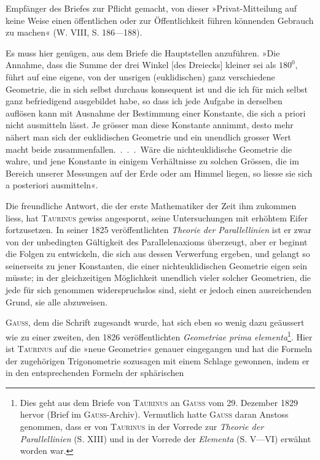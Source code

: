 \noindent Empfänger des Briefes zur Pflicht gemacht, von dieser »Privat-Mitteilung auf
keine Weise einen öffentlichen oder zur Öffentlichkeit führen könnenden Gebrauch
zu machen« (W. VIII, S. 186—188).
\par
Es muss hier genügen, aus dem Briefe die Hauptstellen anzuführen. »Die
Annahme, dass die Summe der drei Winkel [des Dreiecks] kleiner sei als
\(180^0\), führt auf eine eigene, von der unsrigen (euklidischen) ganz verschiedene
Geometrie, die in sich selbst durchaus konsequent ist und die ich für mich
selbst ganz befriedigend ausgebildet habe, so dass ich jede Aufgabe in derselben
auflösen kann mit Ausnahme der Bestimmung einer Konstante, die
sich a priori nicht ausmitteln lässt. Je grösser man diese Konstante annimmt,
desto mehr nähert man sich der euklidischen Geometrie und ein unendlich
grosser Wert macht beide zusammenfallen.\ .\ .\ .\ Wäre die nichteuklidische
Geometrie die wahre, und jene Konstante in einigem Verhältnisse zu solchen
Grössen, die im Bereich unserer Messungen auf der Erde oder am Himmel
liegen, so liesse sie sich a posteriori ausmitteln«.
\par
Die freundliche Antwort, die der erste Mathematiker der Zeit ihm zukommen
liess, hat \textsc{Taurinus} gewiss angespornt, seine Untersuchungen mit erhöhtem
Eifer fortzusetzen. In seiner 1825 veröffentlichten \textit{Theorie der Parallellinien}
ist er zwar von der unbedingten Gültigkeit des Parallelenaxioms überzeugt,
aber er beginnt die Folgen zu entwickeln, die sich aus dessen Verwerfung
ergeben, und gelangt so seinerseits zu jener Konstanten, die einer nichteuklidischen
Geometrie eigen sein müsste; in der gleichzeitigen Möglichkeit unendlich
vieler solcher Geometrien, die jede für sich genommen widerspruchslos sind,
sieht er jedoch einen ausreichenden Grund, sie alle abzuweisen.
\par
\textsc{Gauss}, dem die Schrift zugesandt wurde, hat sich eben so wenig dazu
geäussert wie zu einer zweiten, den 1826 veröffentlichten \textit{Geometriae prima
elementa}\footnote{Dies geht aus dem Briefe von \textsc{Taurinus} an \textsc{Gauss} vom 29. Dezember 1829 hervor (Brief im \textsc{Gauss}-Archiv). Vermutlich hatte \textsc{Gauss} daran Anstoss genommen, dass er von \textsc{Taurinus} in der Vorrede zur \textit{Theorie der Parallellinien} (S. XIII) und in der Vorrede der \textit{Elementa} (S. V—VI) erwähnt worden war.}. Hier ist \textsc{Taurinus} auf die »neue Geometrie« genauer eingegangen
und hat die Formeln der zugehörigen Trigonometrie sozusagen mit einem
Schlage gewonnen, indem er in den entsprechenden Formeln der sphärischen
